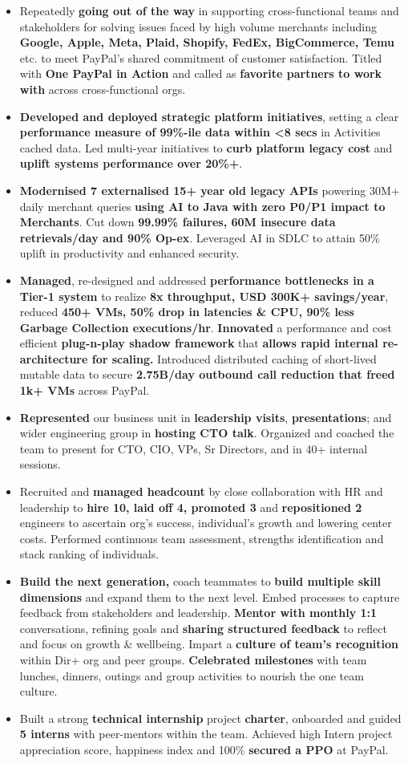 \documentclass[10pt,letterpaper]{article}
\newcommand{\bd}[1]{\textbf{#1}}
\begin{document}
\begin{itemize}
{  on PayPal}.
\item Repeatedly \bd{going out of the way} in supporting cross-functional teams and stakeholders for solving issues faced
  by high volume merchants including \bd{Google, Apple, Meta, Plaid, Shopify, FedEx, BigCommerce, Temu} etc. to meet
  PayPal's shared commitment of customer satisfaction. Titled with \bd{One PayPal in Action}
  and called as \bd{favorite partners to work with} across cross-functional orgs.
\item \bd{Developed and deployed strategic platform initiatives}, setting a clear
  \bd{performance measure of 99\%-ile data within <8 secs} in Activities cached data. Led
  multi-year initiatives to \bd{curb platform legacy cost} and \bd{uplift systems
  performance over 20\%+}. 
\item \bd{Modernised 7 externalised 15+ year old legacy APIs} powering 30M+ daily merchant queries \bd{using AI to Java with zero P0/P1 impact to Merchants}.
 Cut down \bd{99.99\% failures, 60M insecure data retrievals/day and 90\% Op-ex}. Leveraged AI in SDLC to attain 50\% uplift in productivity and enhanced security.
\item \bd{Managed}, re-designed and addressed \bd{performance bottlenecks in a Tier-1
  system} to realize \bd{8x throughput, USD 300K+ savings/year}, reduced \bd{450+ VMs, 50\% drop in latencies \& CPU, 90\% less Garbage Collection executions/hr}.
  \bd{Innovated} a performance and cost efficient \bd{plug-n-play
  shadow framework} that \bd{allows rapid internal re-architecture for scaling.} Introduced 
  distributed caching of short-lived mutable data to secure \bd{2.75B/day outbound
  call reduction that freed 1k+ VMs} across PayPal.
\item \bd{Represented} our business unit in \bd{leadership visits}, \bd{presentations}; and
  wider engineering group in \bd{hosting CTO talk}. Organized and coached the team to
  present for CTO, CIO, VPs, Sr Directors, and in 40+ internal sessions.
\item Recruited and \bd{managed headcount} by close collaboration with HR and leadership to
  \bd{hire 10, laid off 4, promoted 3} and \bd{repositioned 2} engineers to ascertain org's
  success, individual's growth and lowering center costs. Performed continuous team
  assessment, strengths identification and stack ranking of individuals.
\item \bd{Build the next generation,} coach teammates to \bd{build multiple skill
  dimensions} and expand them to the next level. Embed processes to capture feedback from
  stakeholders and leadership. \bd{Mentor with monthly 1:1} conversations, refining goals
  and \bd{sharing structured feedback} to reflect and focus on growth \& wellbeing. Impart a
  \bd{culture of team's recognition} within Dir+ org and peer groups. \bd{Celebrated
  milestones} with team lunches, dinners, outings and group activities to nourish the one
  team culture.
\item Built a strong \bd{technical internship} project \bd{charter}, onboarded and guided
  \bd{5 interns} with peer-mentors within the team. Achieved high Intern project
  appreciation score, happiness index and 100\% \bd{secured a PPO} at PayPal.
\end{itemize}
\end{document}
